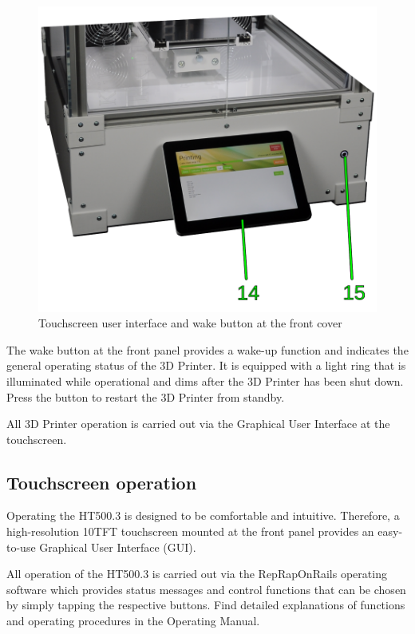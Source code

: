 \begin{figure}[H]
  \centering
  \includegraphics[width=.7\linewidth]{./img/desc_ht500_electronicchamberfront.png}
  \caption{Touchscreen user interface and wake button at the front cover}
\end{figure}

The wake button at the front panel provides a wake-up function and indicates the general operating status of the 3D Printer. It is equipped with a light ring that is illuminated while operational and dims after the 3D Printer has been shut down. Press the button to restart the 3D Printer from standby.

All 3D Printer operation is carried out via the Graphical User Interface at the touchscreen. 



\subsection{Touchscreen operation}

Operating the HT500.3 is designed to be comfortable and intuitive. Therefore, a high-resolution 10\textquotedbl TFT touchscreen mounted at the front panel provides an easy-to-use Graphical User Interface (GUI).

All operation of the HT500.3 is carried out via the RepRapOnRails operating software which provides status messages and control functions that can be chosen by simply tapping the respective buttons. Find detailed explanations of functions and operating procedures in the Operating Manual.

